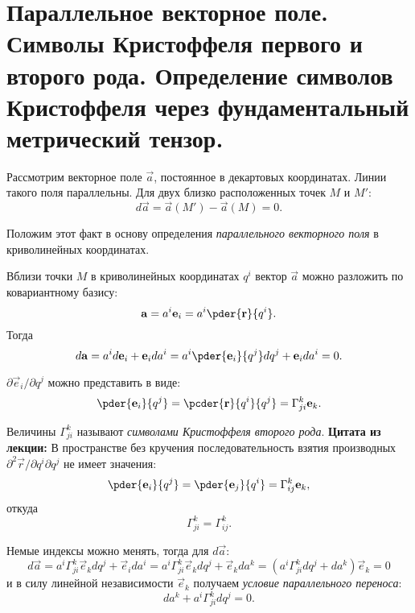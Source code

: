 \chapter{Параллельное векторное поле. Символы Кристоффеля первого и второго
рода. Определение символов Кристоффеля через фундаментальный метрический тензор.}
Рассмотрим векторное поле \( \vec{a} \), постоянное в декартовых координатах.
Линии такого поля параллельны. Для двух близко расположенных точек \( M \) и
\( M' \):
\[
    d\vec{a} = \vec{a}(M') - \vec{a}(M) = 0.
\]
    
Положим этот факт в основу определения \emph{параллельного векторного поля} в
криволинейных координатах.

Вблизи точки \( M \) в криволинейных координатах \( q^i \) вектор \( \vec{a} \)
можно разложить по ковариантному базису:
\[
    \vec{a} = a^i \vec{e}_{i} = a^i \pder{\vec{r}}{q^i}.
\]
Тогда
\[
    d\vec{a} = a^i d\vec{e}_{i} + \vec{e}_{i} da^i  = 
    a^i \pder{\vec{e}_{i}}{q^j} dq^j + \vec{e}_{i} da^i = 0.
\]
    
\( \partial\vec{e}_{i}/{\partial q^j} \) можно представить в виде:
\[
    \pder{\vec{e}_{i}}{q^j} = 
    \pcder{\vec{r}}{q^i}{q^j} =
    \Gamma^k_{ji} \vec{e}_{k}.
\]

Величины \( \Gamma^k_{ji} \) называют \emph{символами Кристоффеля второго рода}.
\textbf{Цитата из лекции:} В пространстве без кручения последовательность
взятия производных \( \partial^2{\vec{r}}/{\partial q^i \partial  q^j} \) не
имеет значения:
\[
    \pder{\vec{e}_{i}}{q^j} = 
    \pder{\vec{e}_{j}}{q^i} =
    \Gamma^k_{ij} \vec{e}_{k},
\]
откуда
\[
    \Gamma^k_{ji} = \Gamma^k_{ij}.
\]

Немые индексы можно менять, тогда для \( d\vec{a} \):
\[
    d\vec{a} = 
    a^i \Gamma^k_{ji} \vec{e}_{k} dq^j + \vec{e}_{i} da^i = 
    a^i \Gamma^k_{ji} \vec{e}_{k} dq^j + \vec{e}_{k} da^k =
    \left(a^i \Gamma^k_{ji} dq^j + da^k\right)\vec{e}_{k}  =
    0
\]
и в силу линейной независимости \( \vec{e}_{k} \) получаем \emph{условие
параллельного переноса}:
\[
    da^k + a^i \Gamma^k_{ji} dq^j  = 0.
\]
    
